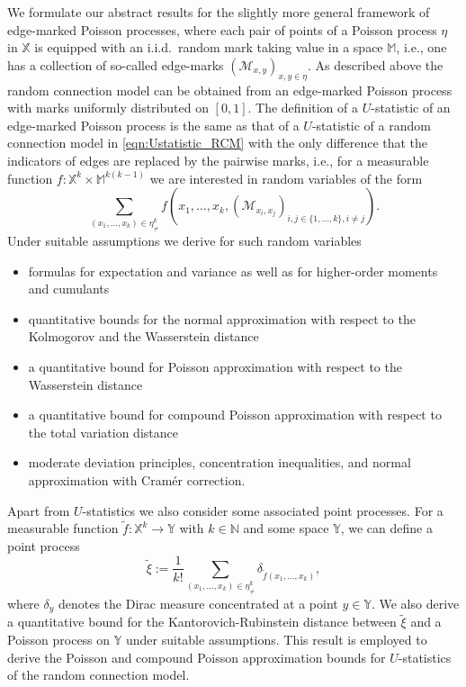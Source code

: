 \documentclass{article}
\theoremstyle{definition}
\numberwithin{equation}{section}
\theoremstyle{remark}
\begin{document}

We formulate our abstract results for the slightly more general framework of edge-marked Poisson processes, where each pair of points of a Poisson process $\eta$ in $\mathbb{X}$ is equipped with an i.i.d.\ random mark taking value in a space $\mathbb{M}$, i.e., one has a collection of so-called edge-marks $(\mathcal{M}_{x,y})_{x,y\in\eta}$. As described above the random connection model can be obtained from an edge-marked Poisson process with marks uniformly distributed on $[0,1]$. The definition of a $U$-statistic of an edge-marked Poisson process is the same as that of a $U$-statistic of a random connection model in \eqref{eqn:Ustatistic_RCM} with the only difference that the indicators of edges are replaced by the pairwise marks, i.e., for a measurable function $f:\mathbb{X}^k\times\mathbb{M}^{k(k-1)}$ we are interested in random variables of the form
$$
\sum_{(x_1,\ldots,x_k)\in\eta^k_{\neq}} f(x_1,\ldots,x_k, (\mathcal{M}_{x_i,x_j})_{i,j\in\{1,\ldots,k\},i\neq j}).
$$ 
Under suitable assumptions we derive for such random variables
\begin{itemize}
\item formulas for expectation and variance as well as for higher-order moments and cumulants
\item quantitative bounds for the normal approximation with respect to the Kolmogorov and the Wasserstein distance
\item a quantitative bound for Poisson approximation with respect to the Wasserstein distance
\item a quantitative bound for compound Poisson approximation with respect to the total variation distance
\item moderate deviation principles, concentration inequalities, and normal approximation with Cramér correction.
\end{itemize}
Apart from $U$-statistics we also consider some associated point processes. For a measurable function $\tilde{f}:\mathbb{X}^k\to\mathbb{Y}$ with $k\in\mathbb{N}$ and some space $\mathbb{Y}$, we can define a point process
$$
\tilde{\xi}:=\frac{1}{k!}\sum_{(x_1,\ldots,x_k)\in\eta^k_{\neq}} \delta_{\tilde{f}(x_1,\ldots,x_k)},
$$ 
where $\delta_y$ denotes the Dirac measure concentrated at a point $y\in\mathbb{Y}$. We also derive a quantitative bound for the Kantorovich-Rubinstein distance between $\tilde{\xi}$ and a Poisson process on $\mathbb{Y}$ under suitable assumptions. This result is employed to derive the Poisson and compound Poisson approximation bounds for $U$-statistics of the random connection model.
\end{document}
